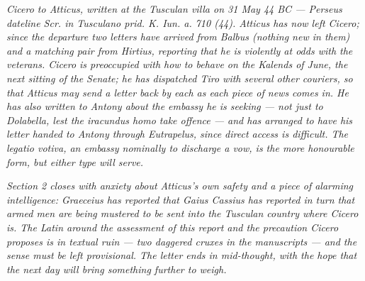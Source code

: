 
\textit{Cicero to Atticus, written at the Tusculan villa on 31
May 44 BC --- Perseus dateline \textit{Scr. in Tusculano prid.
K. Iun. a. 710 (44)}. Atticus has now left Cicero; since the
departure two letters have arrived from Balbus (nothing new in
them) and a matching pair from Hirtius, reporting that he is
violently at odds with the veterans. Cicero is preoccupied with
how to behave on the Kalends of June, the next sitting of the
Senate; he has dispatched Tiro with several other couriers, so
that Atticus may send a letter back by each as each piece of
news comes in. He has also written to Antony about the embassy
he is seeking --- not just to Dolabella, lest the
\textit{iracundus homo} take offence --- and has arranged to
have his letter handed to Antony through Eutrapelus, since
direct access is difficult. The \textit{legatio votiva}, an
embassy nominally to discharge a vow, is the more honourable
form, but either type will serve.}

\textit{Section 2 closes with anxiety about Atticus's own
safety and a piece of alarming intelligence: Graeceius has
reported that Gaius Cassius has reported in turn that armed
men are being mustered to be sent into the Tusculan country
where Cicero is. The Latin around the assessment of this
report and the precaution Cicero proposes is in textual ruin
--- two daggered cruxes in the manuscripts --- and the sense
must be left provisional. The letter ends in mid-thought, with
the hope that the next day will bring something further to
weigh.}
